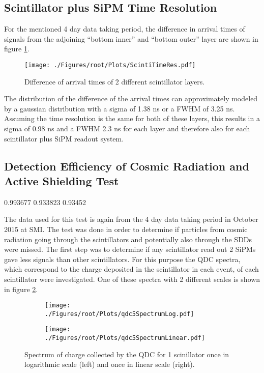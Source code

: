 \subsection{Scintillator plus SiPM Time Resolution}

For the mentioned 4 day data taking period, the difference in arrival times of signals from the adjoining ``bottom inner'' and ``bottom outer'' layer are shown in figure \ref{fig:scintiTimeRes}.
\begin{figure}[h]
 \centering
 \texttt{[image: ./Figures/root/Plots/ScintiTimeRes.pdf]}
 \caption{Difference of arrival times of 2 different scintillator layers.}
 \label{fig:scintiTimeRes}
\end{figure}
The distribution of the difference of the arrival times can approximately modeled by a gaussian distribution with a sigma of 1.38 ns or a FWHM of 3.25 ns.  Assuming the time resolution is the same for both of these layers, this results in a sigma of 0.98 ns and a FWHM 2.3 ns for each layer and therefore also for each scintillator plus SiPM readout system.

\subsection{Detection Efficiency of Cosmic Radiation and Active Shielding Test}
0.993677 0.933823 0.93452

The data used for this test is again from the 4 day data taking period in October 2015 at SMI. The test was done in order to determine if particles from cosmic radiation going through the scintillators and potentially also through the SDDs were missed. The first step was to determine if any scintillator read out 2 SiPMs gave less signals than other scintillators. For this purpose the QDC spectra, which correspond to the charge deposited in the scintillator in each event, of each scintillator were investigated. One of these spectra with 2 different scales is shown in figure \ref{fig:qdc5Spec}.

\begin{figure}[h]
 \centering
 \begin{subfigure}{.49\textwidth}
 \centering
 \texttt{[image: ./Figures/root/Plots/qdc5SpectrumLog.pdf]}
 \end{subfigure}
 \hfill
 \begin{subfigure}{.49\textwidth}
 \centering
 \texttt{[image: ./Figures/root/Plots/qdc5SpectrumLinear.pdf]}
 \end{subfigure}
 \caption{Spectrum of charge collected by the QDC for 1 scinillator once in logarithmic scale (left) and once in linear scale (right).}
 \label{fig:qdc5Spec}
\end{figure}

